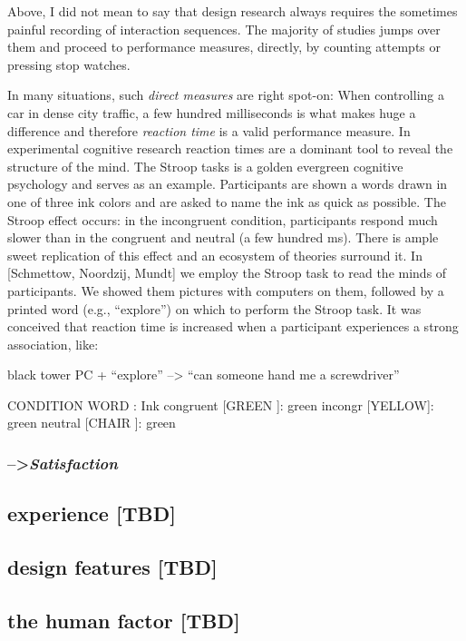 \documentclass[]{svmono}
\begin{document}
Above, I did not mean to say that design research always requires the
sometimes painful recording of interaction sequences. The majority of
studies jumps over them and proceed to performance measures, directly,
by counting attempts or pressing stop watches.

In many situations, such \emph{direct measures} are right spot-on: When
controlling a car in dense city traffic, a few hundred milliseconds is
what makes huge a difference and therefore \emph{reaction time} is a
valid performance measure. In experimental cognitive research reaction
times are a dominant tool to reveal the structure of the mind. The
Stroop tasks is a golden evergreen cognitive psychology and serves as an
example. Participants are shown a words drawn in one of three ink colors
and are asked to name the ink as quick as possible. The Stroop effect
occurs: in the incongruent condition, participants respond much slower
than in the congruent and neutral (a few hundred ms). There is ample
sweet replication of this effect and an ecosystem of theories surround
it. In {[}Schmettow, Noordzij, Mundt{]} we employ the Stroop task to
read the minds of participants. We showed them pictures with computers
on them, followed by a printed word (e.g., ``explore'') on which to
perform the Stroop task. It was conceived that reaction time is
increased when a participant experiences a strong association, like:

black tower PC + ``explore'' --\textgreater{} ``can someone hand me a
screwdriver''

CONDITION WORD : Ink congruent {[}GREEN {]}: green incongr {[}YELLOW{]}:
green neutral {[}CHAIR {]}: green

\subsubsection{\texorpdfstring{--\textgreater{}\emph{Satisfaction}}{--\textgreater{}Satisfaction}}\label{satisfaction}

\subsection{experience {[}TBD{]}}\label{experience-tbd}

\subsection{design features {[}TBD{]}}\label{design-features-tbd}

\subsection{the human factor {[}TBD{]}}\label{the-human-factor-tbd}
\end{document}
